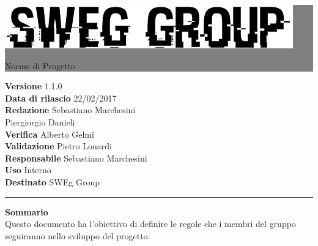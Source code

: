\documentclass[12pt,a4paper,titlepage]{article}
\newcommand{\HRule}[1]{\hfill \rule{0.2\linewidth}{#1}} %
\begin{document}
	
	\thispagestyle{empty} %
	
	
	\colorbox{grey}{
		\parbox[t]{1.0\linewidth}{
			\centering \fontsize{50pt}{80pt}\selectfont %
			\vspace*{0.7cm} %
			
			\raggedleft
			\includegraphics[width=0.7\linewidth]{../LogoSWEgGroupSFONDOVUOTO.png}
			
			\hfill Norme di Progetto \\
			
			\vspace*{0.7cm} %
		}
	}
	
	
	\vfill %
	
	
	{\centering \large 
		\hfill \textbf{Versione} 1.1.0 \\
		\hfill \textbf{Data di rilascio} 22/02/2017 \\
		\hfill \textbf{Redazione} Sebastiano Marchesini \\
		\hfill Piergiorgio Danieli \\
		\hfill \textbf{Verifica} Alberto Gelmi \\
		\hfill \textbf{Validazione} Pietro Lonardi \\
		\hfill \textbf{Responsabile} Sebastiano Marchesini \\
		\hfill \textbf{Uso} Interno \\
		\hfill \textbf{Destinato} SWEg Group \\ 
		
		\HRule{1pt}
		
		\textbf{Sommario} \\
		Questo documento ha l'obiettivo di definire le regole che i membri del gruppo seguiranno nello sviluppo del progetto.
		
	} %
	
\end{document}
